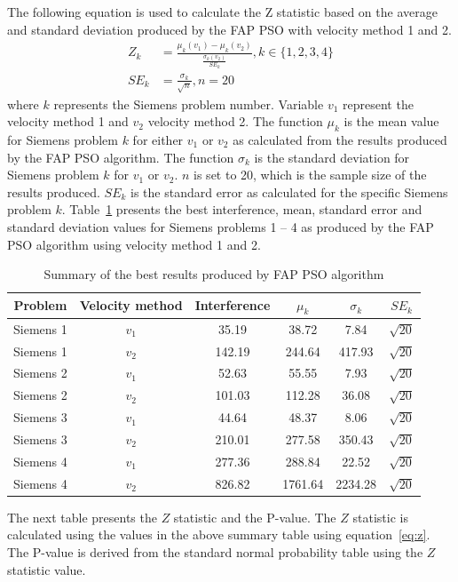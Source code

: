 The following equation is used to calculate the Z statistic based on the average and standard deviation produced by the FAP PSO with velocity method 1 and 2.
\begin{align}
    Z_k &= \frac{\mu_k(v_1) - \mu_k(v_2)}{\frac{\sigma_k(v_2)}{SE_k}}, k \in \{1,2,3,4\}\label{eq:z}\\
    SE_k &= \frac{\sigma_k}{\sqrt{n}}, n = 20
\end{align}
where $k$ represents the Siemens problem number. Variable $v_1$ represent the velocity method 1 and $v_2$ velocity method 2. The function $\mu_k$ is the mean value for Siemens problem $k$ for either $v_1$ or $v_2$ as calculated from the results produced by the FAP PSO algorithm. The function $\sigma_k$ is the standard deviation for Siemens problem $k$ for $v_1$ or $v_2$. $n$ is set to 20, which is the sample size of the results produced. $SE_k$ is the standard error as calculated for the specific Siemens problem $k$.
Table~\ref{tbl:hypothesis} presents the best interference, mean, standard error and standard deviation values for Siemens problems 1 -- 4 as produced by the FAP PSO algorithm using velocity method 1 and 2.
\begin{table}[H]
\centering
\begin{tabular}{cccccc}
	\toprule
    Problem & Velocity method & Interference & $\mu_k$ & $\sigma_k$ & $SE_k$  \\
    \midrule
    Siemens 1 & $v_1$ & 35.19 & 38.72 & 7.84 & $\sqrt{20}$\\
    Siemens 1 & $v_2$ & 142.19 & 244.64 & 417.93 & $\sqrt{20}$\\
    Siemens 2 & $v_1$ & 52.63 & 55.55 & 7.93 & $\sqrt{20}$\\
    Siemens 2 & $v_2$ & 101.03 & 112.28 & 36.08 & $\sqrt{20}$\\
    Siemens 3 & $v_1$ & 44.64 & 48.37 & 8.06 & $\sqrt{20}$\\
    Siemens 3 & $v_2$ & 210.01 & 277.58 & 350.43 & $\sqrt{20}$\\
    Siemens 4 & $v_1$ & 277.36 & 288.84 & 22.52 & $\sqrt{20}$\\
    Siemens 4 & $v_2$ & 826.82 & 1761.64 & 2234.28 & $\sqrt{20}$\\
    \bottomrule
	\end{tabular}
\caption{Summary of the best results produced by FAP PSO algorithm}
\label{tbl:hypothesis}
\end{table}
The next table presents the $Z$ statistic and the P-value. The $Z$ statistic is calculated using the values in the above summary table using equation~\ref{eq:z}. The P-value is derived from the standard normal probability table using the $Z$ statistic value.
